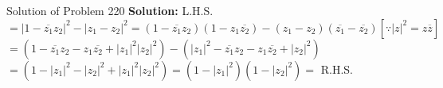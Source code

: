 \documentclass[aspectratio=169,8pt]{beamer}
\begin{document}
\begin{frame}{Solution of Problem 220}
  \textbf{Solution:} L.H.S. $= |1 - \overline{z_1}z_2|^2 - |z_1 - z_2|^2 = (1 - \overline{z_1}z_2)(1 - z_1\overline{z_2}) - (z_1 -
  z_2)(\overline{z_1} - \overline{z_2})[\because |z|^2 = z\overline{z}]$
  \\\vspace*{0.2cm}
  $= (1 - \overline{z_1}z_2 - z_1\overline{z_2} + |z_1|^2|z_2|^2) - (|z_1|^2 - \overline{z_1}z_2 - z_1\overline{z_2} + |z_2|^2)$
  \\\vspace*{0.2cm}
  $= (1 - |z_1|^2 - |z_2|^2 + |z_1|^2|z_2|^2) = (1 - |z_1|^2)(1 - |z_2|^2) =$ R.H.S.
\end{frame}
\end{document}
